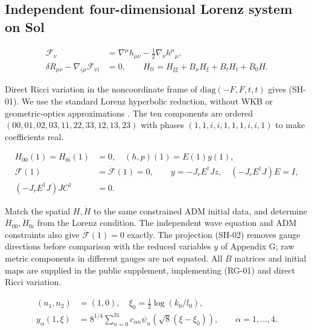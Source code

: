 \subsection{Independent four-dimensional Lorenz system on Sol}

\begin{equation}\tag{SH-01}\label{eq:SH-01}
\begin{aligned}
\mathcal F_\nu&=\nabla^\mu h_{\mu\nu}-\tfrac12\nabla_\nu h^\mu{}_\mu,\\
\delta R_{\mu\nu}-\nabla_{(\mu}\mathcal F_{\nu)}&=0,\qquad
H_{tt}=H_{\xi\xi}+B_xH_\xi+B_tH_t+B_0H.
\end{aligned}
\end{equation}

Direct Ricci variation in the noncoordinate frame of $\mathrm{diag}(-F,F,t,t)$ gives (SH-01). We use the standard Lorenz hyperbolic reduction, without WKB or geometric-optics approximations \cite{Andersson2021}. The ten components are ordered $(00,01,02,03,11,22,33,12,13,23)$ with phases $(1,1,i,i,1,1,1,i,i,1)$ to make coefficients real.

\begin{equation}\tag{SH-02}\label{eq:SH-02}
\begin{aligned}
H_{00}(1)=H_{0i}(1)&=0,\quad (h,p)(1)=E(1)y(1),\\
\mathcal F(1)&=\dot{\mathcal F}(1)=0,\qquad
y=-J_rE^\dagger Jz,\quad (-J_rE^\dagger J)E=I,\\
(-J_rE^\dagger J)JC^\dagger&=0.
\end{aligned}
\end{equation}

Match the spatial $H,\dot H$ to the same constrained ADM initial data, and determine $\dot H_{00},\dot H_{0i}$ from the Lorenz condition. The independent wave equation and ADM constraints also give $\dot{\mathcal F}(1)=0$ exactly. The projection (SH-02) removes gauge directions before comparison with the reduced variables $y$ of Appendix G; raw metric components in different gauges are not equated. All $B$ matrices and initial maps are supplied in the public supplement, implementing (RG-01) and direct Ricci variation.

\begin{equation}\tag{SH-03}\label{eq:SH-03}
\begin{aligned}
(n_1,n_2)&=(1,0),\quad \xi_0=\tfrac12\log(k_0/l_0),\\
y_\alpha(1,\xi)&=8^{1/4}\sum_{n=0}^{31}c_{\alpha n}
 \psi_n(\sqrt8(\xi-\xi_0)),\qquad \alpha=1,\ldots,4.
\end{aligned}
\end{equation}

